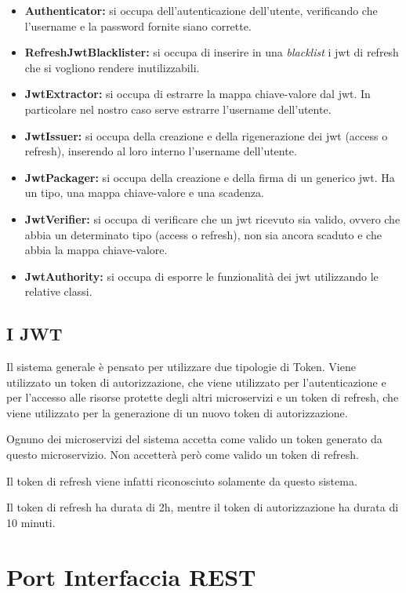 \begin{itemize}
    \item \textbf{Authenticator:} si occupa dell'autenticazione dell'utente, verificando che l'username e la password fornite siano corrette.
    \item \textbf{RefreshJwtBlacklister:} si occupa di inserire in una \textit{blacklist} i jwt di refresh che si vogliono rendere inutilizzabili.
    \item \textbf{JwtExtractor:} si occupa di estrarre la mappa chiave-valore dal jwt. In particolare nel nostro caso serve estrarre l'username dell'utente.
    \item \textbf{JwtIssuer:} si occupa della creazione e della rigenerazione dei jwt (access o refresh), inserendo al loro interno l'username dell'utente.
    \item \textbf{JwtPackager:} si occupa della creazione e della firma di un generico jwt. Ha un tipo, una mappa chiave-valore e una scadenza.
    \item \textbf{JwtVerifier:} si occupa di verificare che un jwt ricevuto sia valido, ovvero che abbia un determinato tipo (access o refresh), non sia ancora scaduto e che abbia la mappa chiave-valore.
    \item \textbf{JwtAuthority:} si occupa di esporre le funzionalità dei jwt utilizzando le relative classi.
\end{itemize}


\subsection{I JWT}

Il sistema generale è pensato per utilizzare due tipologie di Token. Viene utilizzato un token di autorizzazione, che viene utilizzato per l'autenticazione e per l'accesso alle risorse protette degli altri microservizi e un token di refresh, che viene utilizzato per la generazione di un nuovo token di autorizzazione.

Ognuno dei microservizi del sistema accetta come valido un token generato da questo microservizio. Non accetterà però come valido un token di refresh.

Il token di refresh viene infatti riconosciuto solamente da questo sistema.

Il token di refresh ha durata di 2h, mentre il token di autorizzazione ha durata di 10 minuti.

\section{Port Interfaccia REST}

